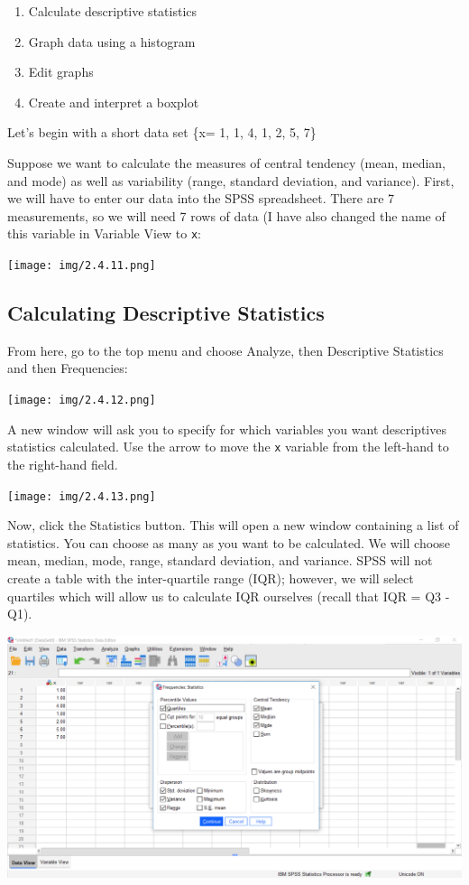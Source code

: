 \documentclass[
]{book}
\providecommand{\tightlist}{%
  \setlength{\itemsep}{0pt}\setlength{\parskip}{0pt}}
\begin{document}
\begin{enumerate}
\def\labelenumi{\arabic{enumi}.}
\tightlist
\item
  Calculate descriptive statistics
\item
  Graph data using a histogram
\item
  Edit graphs
\item
  Create and interpret a boxplot
\end{enumerate}

Let's begin with a short data set \{x= 1, 1, 4, 1, 2, 5, 7\}

Suppose we want to calculate the measures of central tendency (mean, median, and mode) as well as variability (range, standard deviation, and variance). First, we will have to enter our data into the SPSS spreadsheet. There are 7 measurements, so we will need 7 rows of data (I have also changed the name of this variable in Variable View to \texttt{x}:

\texttt{[image: img/2.4.11.png]}

\hypertarget{calculating-descriptive-statistics}{%
\subsection{Calculating Descriptive Statistics}\label{calculating-descriptive-statistics}}

From here, go to the top menu and choose {Analyze}, then {Descriptive Statistics} and then {Frequencies}:

\texttt{[image: img/2.4.12.png]}

A new window will ask you to specify for which variables you want descriptives statistics calculated. Use the arrow to move the \texttt{x} variable from the left-hand to the right-hand field.

\texttt{[image: img/2.4.13.png]}

Now, click the {Statistics} button. This will open a new window containing a list of statistics. You can choose as many as you want to be calculated. We will choose {mean, median, mode, range, standard deviation, and variance}. SPSS will not create a table with the inter-quartile range (IQR); however, we will select quartiles which will allow us to calculate IQR ourselves (recall that IQR = Q3 - Q1).

\includegraphics{img/2.4.14.png}
\end{document}
